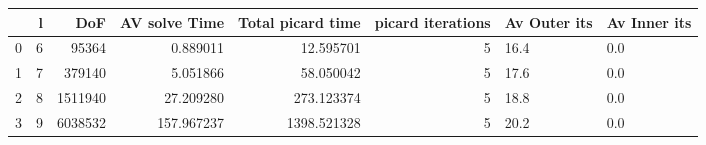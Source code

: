 \begin{tabular}{lrrrrrll}
\toprule
{} &  l &      DoF &  AV solve Time &  Total picard time &  picard iterations & Av Outer its & Av Inner its \\
\midrule
0 &  6 &    95364 &       0.889011 &          12.595701 &                  5 &         16.4 &          0.0 \\
1 &  7 &   379140 &       5.051866 &          58.050042 &                  5 &         17.6 &          0.0 \\
2 &  8 &  1511940 &      27.209280 &         273.123374 &                  5 &         18.8 &          0.0 \\
3 &  9 &  6038532 &     157.967237 &        1398.521328 &                  5 &         20.2 &          0.0 \\
\bottomrule
\end{tabular}
